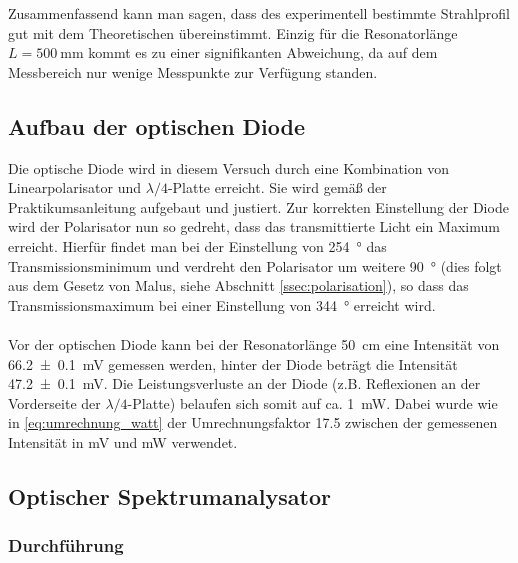 \documentclass[11pt, a4paper]{article}
\numberwithin{equation}{section}
\begin{document}
Zusammenfassend kann man sagen, dass des experimentell bestimmte Strahlprofil gut mit dem Theoretischen übereinstimmt.
Einzig für die Resonatorlänge $L = \SI{500}{\milli\metre}$ kommt es zu einer signifikanten Abweichung, da auf dem Messbereich nur wenige Messpunkte zur Verfügung standen.


\subsection{Aufbau der optischen Diode}

Die optische Diode wird in diesem Versuch durch eine Kombination von Linearpolarisator und $\lambda/4$-Platte erreicht.
Sie wird gemäß der Praktikumsanleitung aufgebaut und justiert.
Zur korrekten Einstellung der Diode wird der Polarisator nun so gedreht, dass das transmittierte Licht ein Maximum erreicht.
Hierfür findet man bei der Einstellung von \SI{254}{\degree} das Transmissionsminimum und verdreht den Polarisator um weitere \SI{90}{\degree} (dies folgt aus dem Gesetz von Malus, siehe Abschnitt \ref{ssec:polarisation}), so dass das Transmissionsmaximum bei einer Einstellung von \SI{344}{\degree} erreicht wird.\\
\\
Vor der optischen Diode kann bei der Resonatorlänge \SI{50}{\centi\metre} eine Intensität von \SI{66.2+-0.1}{\milli\volt} gemessen werden, hinter der Diode beträgt die Intensität \SI{47.2+-0.1}{\milli\volt}.
Die Leistungsverluste an der Diode (z.B. Reflexionen an der Vorderseite der $\lambda/4$-Platte) belaufen sich somit auf ca. \SI{1}{\milli\watt}.
Dabei wurde wie in \eqref{eq:umrechnung_watt} der Umrechnungsfaktor \num{17.5} zwischen der gemessenen Intensität in \si{\milli\volt} und \si{\milli\watt} verwendet.

\subsection{Optischer Spektrumanalysator}

\subsubsection{Durchführung}
\end{document}
